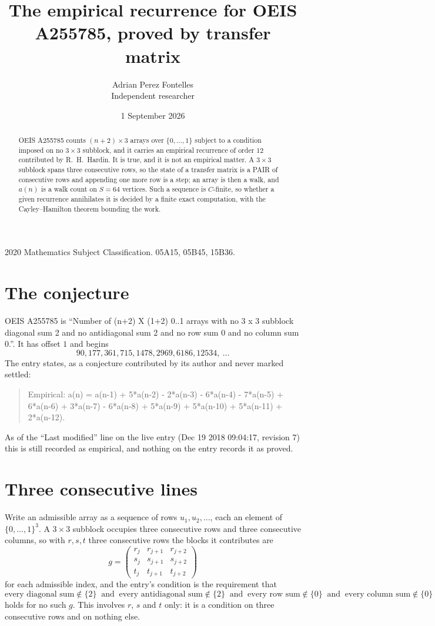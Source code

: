\documentclass[11pt,a4paper]{article}
\title{The empirical recurrence for OEIS A255785, proved by transfer matrix}
\author{Adrian Perez Fontelles\\ \small Independent researcher}
\date{1 September 2026}
\theoremstyle{plain}
\theoremstyle{definition}
\begin{document}
\maketitle

\begin{abstract}
OEIS A255785 counts $(n+2)\times3$ arrays over $\{0,\dots,1\}$ subject to a condition imposed on
no $3\times3$ subblock, and it carries an empirical recurrence of order $12$
contributed by R.~H.~Hardin. It is true, and it is not an empirical matter. A $3\times3$
subblock spans three consecutive rows, so the state of a transfer matrix is a PAIR of
consecutive rows and appending one more row is a step; an array is then a walk, and
$a(n)$ is a walk count on $S=64$ vertices. Such a sequence is $C$-finite, so whether a given
recurrence annihilates it is decided by a finite exact computation, with the Cayley--Hamilton
theorem bounding the work.
\end{abstract}

\noindent\small 2020 Mathematics Subject Classification. 05A15, 05B45, 15B36.\normalsize

\section{The conjecture}

OEIS A255785 is ``Number of (n+2) X (1+2) 0..1 arrays with no 3 x 3 subblock diagonal sum 2 and no antidiagonal sum 2 and no row sum 0 and no column sum 0.''. It has offset $1$ and begins
\[
90, 177, 361, 715, 1478, 2969, 6186, 12534,\ \dots
\]
The entry states, as a conjecture contributed by its author and never marked settled:
\begin{quote}
Empirical: a(n) = a(n-1) + 5*a(n-2) - 2*a(n-3) - 6*a(n-4) - 7*a(n-5) + 6*a(n-6) + 3*a(n-7) - 6*a(n-8) + 5*a(n-9) + 5*a(n-10) + 5*a(n-11) + 2*a(n-12).
\end{quote}
As of the ``Last modified'' line on the live entry (Dec 19 2018 09:04:17, revision 7) this is still
recorded as empirical, and nothing on the entry records it as proved.

\section{Three consecutive lines}

Write an admissible array as a sequence of rows $u_1,u_2,\dots$, each an element of
$\{0,\dots,1\}^{3}$. A $3\times3$ subblock occupies three consecutive rows and
three consecutive columns, so with $r,s,t$ three consecutive rows the blocks it
contributes are
\[
g=\begin{pmatrix}r_j&r_{j+1}&r_{j+2}\\ s_j&s_{j+1}&s_{j+2}\\ t_j&t_{j+1}&t_{j+2}\end{pmatrix}
\]
for each admissible index, and the entry's condition is the requirement that
\[
\text{every diagonal sum} \notin \{2\}\ \text{ and }\ \text{every antidiagonal sum} \notin \{2\}\ \text{ and }\ \text{every row sum} \notin \{0\}\ \text{ and }\ \text{every column sum} \notin \{0\}
\]
holds for no such $g$. This involves $r$, $s$ and $t$ only: it is a condition on
three consecutive rows and on nothing else.
\end{document}
